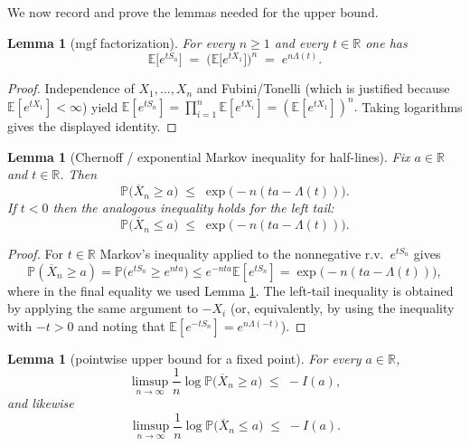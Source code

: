 \documentclass[12pt]{article}
\newtheorem{lemma}[theorem]{Lemma}
\theoremstyle{definition}
\theoremstyle{remark}
\begin{document}
We now record and prove the lemmas needed for the upper bound.

\begin{lemma}[mgf factorization]\label{lem:mgf_factorization}
For every $n\ge1$ and every $t\in\mathbb R$ one has
\[
\mathbb{E}\big[e^{t S_n}\big] \;=\; \big(\mathbb{E}\big[e^{t X_1}\big]\big)^n
       \;=\; e^{n \Lambda(t)}.
\]
\end{lemma}

\begin{proof}
Independence of $X_1,\dots,X_n$ and Fubini/Tonelli (which is justified because
$\mathbb{E}[e^{t X_1}]<\infty$) yield
\(\mathbb{E}[e^{t S_n}] = \prod_{i=1}^n \mathbb{E}[e^{t X_i}] = ( \mathbb{E}[e^{t X_1}] )^n.\)
Taking logarithms gives the displayed identity.
\end{proof}

\begin{lemma}[Chernoff / exponential Markov inequality for half-lines]\label{lem:chernoff_half_line}
Fix $a\in\mathbb R$ and $t\in\mathbb R$.  Then
\[
\mathbb{P}\big( \overline X_n \ge a \big)
\;\le\; \exp\big( -n( t a - \Lambda(t) )\big).
\]
If $t<0$ then the analogous inequality holds for the left tail:
\[
\mathbb{P}\big( \overline X_n \le a \big)
\;\le\; \exp\big( -n( t a - \Lambda(t) )\big).
\]
\end{lemma}

\begin{proof}
For $t\in\mathbb R$ Markov's inequality applied to the nonnegative r.v.\ $e^{t S_n}$ gives
\[
\mathbb{P}(\overline X_n \ge a)
= \mathbb{P}\big(e^{t S_n} \ge e^{n t a}\big)
\le e^{-n t a} \mathbb{E}[e^{t S_n}]
= \exp\big( -n( t a - \Lambda(t) )\big),
\]
where in the final equality we used Lemma \ref{lem:mgf_factorization}.
The left-tail inequality is obtained by applying the same argument to $-X_i$ (or,
equivalently, by using the inequality with $-t>0$ and noting that
$\mathbb{E}[e^{-tS_n}] = e^{n\Lambda(-t)}$).
\end{proof}

\begin{lemma}[pointwise upper bound for a fixed point]\label{lem:upper_point}
For every $a\in\mathbb R$,
\[
\limsup_{n\to\infty}\frac{1}{n}\log \mathbb{P}\big(\overline X_n \ge a\big)
\;\le\; -I(a),
\]
and likewise
\[
\limsup_{n\to\infty}\frac{1}{n}\log \mathbb{P}\big(\overline X_n \le a\big)
\;\le\; -I(a).
\]
\end{lemma}
\end{document}
